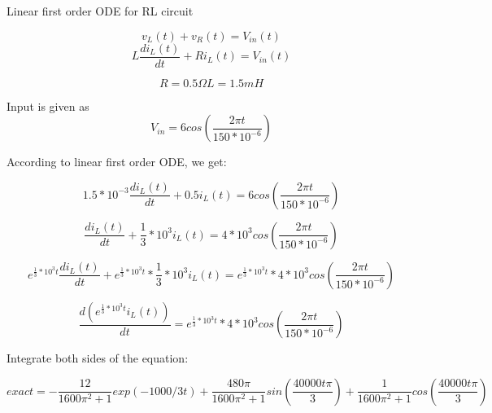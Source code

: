 \documentclass[10pt,a4paper]{article}
\begin{document}
\begin{subsection}{Linear first order ODE for RL circuit}

\begin{equation}
v_L(t)+v_R(t)=V_{in}(t)
\end{equation}
\begin{equation}
L\frac{di_L(t)}{dt}+Ri_L(t)=V_{in}(t)
\end{equation}

\begin{equation}
R=0.5\Omega
L=1.5mH
\end{equation}

Input is given as
\begin{equation}
V_{in}=6cos(\frac{2{\pi}t}{150*{10^{-6}}})
\end{equation}

According to linear first order ODE, we get:

\begin{equation}
1.5*10^{-3}\frac{di_L(t)}{dt}+0.5i_L(t)=6cos(\frac{2{\pi}t}{150*{10^{-6}}})
\end{equation}

\begin{equation}
\frac{di_L(t)}{dt}+\frac{1}{3}*10^3i_L(t)=4*10^3cos(\frac{2{\pi}t}{150*{10^{-6}}})
\end{equation}

\begin{equation}
e^{{\frac{1}{3}*10^3}t}\frac{di_L(t)}{dt}+e^{{\frac{1}{3}*10^3}t}*\frac{1}{3}*10^3i_L(t)=e^{{\frac{1}{3}*10^3}t}*4*10^3cos(\frac{2{\pi}t}{150*{10^{-6}}})
\end{equation}

\begin{equation}
\frac{d(e^{{\frac{1}{3}*10^3}t}i_L(t))}{dt}=e^{{\frac{1}{3}*10^3}t}*4*10^3cos(\frac{2{\pi}t}{150*{10^{-6}}})
\end{equation}

Integrate both sides of the equation:

\begin{equation}
exact=-\frac{12}{1600\pi^2+1}exp(-1000/3t)+\frac{480\pi}{1600\pi^2+1}sin(\frac{40000t\pi}{3})+\frac{1}{1600\pi^2+1}cos(\frac{40000t\pi}{3})
\end{equation}
\end{subsection}
\end{document}
